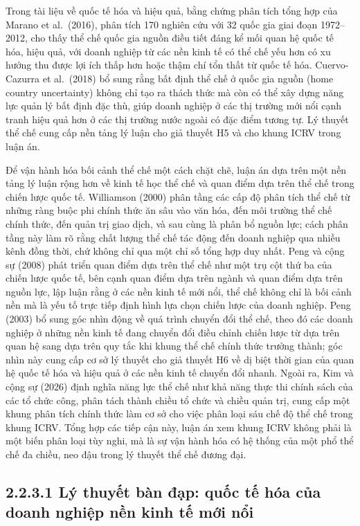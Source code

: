 \documentclass[
  a4paper,
  13pt]{extreport}
\begin{document}
Trong tài liệu về quốc tế hóa và hiệu quả, bằng chứng phân tích tổng hợp
của Marano et al.~(2016), phân tích 170 nghiên cứu với 32 quốc gia giai
đoạn 1972--2012, cho thấy thể chế quốc gia nguồn điều tiết đáng kể mối
quan hệ quốc tế hóa, hiệu quả, với doanh nghiệp từ các nền kinh tế có
thể chế yếu hơn có xu hướng thu được lợi ích thấp hơn hoặc thậm chí tổn
thất từ quốc tế hóa. Cuervo-Cazurra et al.~(2018) bổ sung rằng bất định
thể chế ở quốc gia nguồn (home country uncertainty) không chỉ tạo ra
thách thức mà còn có thể xây dựng năng lực quản lý bất định đặc thù,
giúp doanh nghiệp ở các thị trường mới nổi cạnh tranh hiệu quả hơn ở các
thị trường nước ngoài có đặc điểm tương tự. Lý thuyết thể chế cung cấp
nền tảng lý luận cho giả thuyết H5 và cho khung ICRV trong luận án.

Để vận hành hóa bối cảnh thể chế một cách chặt chẽ, luận án dựa trên một
nền tảng lý luận rộng hơn về kinh tế học thể chế và quan điểm dựa trên
thể chế trong chiến lược quốc tế. Williamson (2000) phân tầng các cấp độ
phân tích thể chế từ những ràng buộc phi chính thức ăn sâu vào văn hóa,
đến môi trường thể chế chính thức, đến quản trị giao dịch, và sau cùng
là phân bổ nguồn lực; cách phân tầng này làm rõ rằng chất lượng thể chế
tác động đến doanh nghiệp qua nhiều kênh đồng thời, chứ không chỉ qua
một chỉ số tổng hợp duy nhất. Peng và cộng sự (2008) phát triển quan
điểm dựa trên thể chế như một trụ cột thứ ba của chiến lược quốc tế, bên
cạnh quan điểm dựa trên ngành và quan điểm dựa trên nguồn lực, lập luận
rằng ở các nền kinh tế mới nổi, thể chế không chỉ là bối cảnh nền mà là
yếu tố trực tiếp định hình lựa chọn chiến lược của doanh nghiệp. Peng
(2003) bổ sung góc nhìn động về quá trình chuyển đổi thể chế, theo đó
các doanh nghiệp ở những nền kinh tế đang chuyển đổi điều chỉnh chiến
lược từ dựa trên quan hệ sang dựa trên quy tắc khi khung thể chế chính
thức trưởng thành; góc nhìn này cung cấp cơ sở lý thuyết cho giả thuyết
H6 về dị biệt thời gian của quan hệ quốc tế hóa và hiệu quả ở các nền
kinh tế chuyển đổi nhanh. Ngoài ra, Kim và cộng sự (2026) định nghĩa
năng lực thể chế như khả năng thực thi chính sách của các tổ chức công,
phân tách thành chiều tổ chức và chiều quản trị, cung cấp một khung phân
tích chính thức làm cơ sở cho việc phân loại sáu chế độ thể chế trong
khung ICRV. Tổng hợp các tiếp cận này, luận án xem khung ICRV không phải
là một biến phân loại tùy nghi, mà là sự vận hành hóa có hệ thống của
một phổ thể chế đa chiều, neo đậu trong lý thuyết thể chế đương đại.

\hypertarget{luxfd-thuyux1ebft-buxe0n-ux111ux1ea1p-quux1ed1c-tux1ebf-huxf3a-cux1ee7a-doanh-nghiux1ec7p-nux1ec1n-kinh-tux1ebf-mux1edbi-nux1ed5i}{%
\subsection{2.2.3.1 Lý thuyết bàn đạp: quốc tế hóa của doanh nghiệp nền
kinh tế mới
nổi}\label{luxfd-thuyux1ebft-buxe0n-ux111ux1ea1p-quux1ed1c-tux1ebf-huxf3a-cux1ee7a-doanh-nghiux1ec7p-nux1ec1n-kinh-tux1ebf-mux1edbi-nux1ed5i}}
\end{document}
